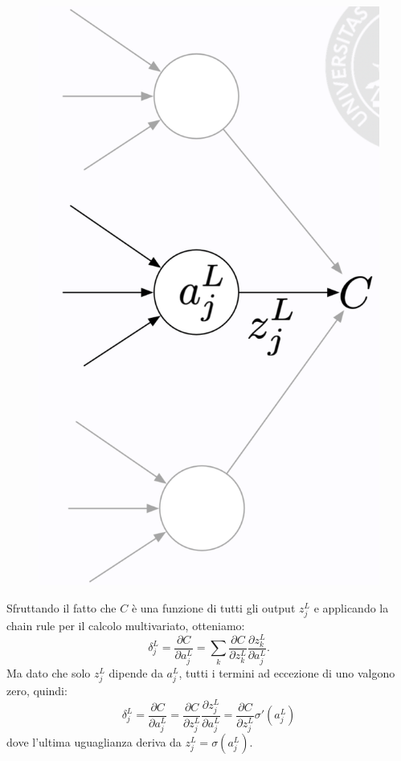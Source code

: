 \begin{figure}[!h]
    \includegraphics[scale=.3]{images/backpropagation/proofBp1.png}
    \centering
\end{figure}


Sfruttando il fatto che $C$ è una funzione di tutti gli output $z^L_j$ e applicando la chain rule per il calcolo multivariato, otteniamo:
\begin{equation}
    \delta^L_j=\frac{\partial C}{\partial a^L_j}=\sum_k\frac{\partial C}{\partial z^L_k}\frac{\partial z^L_k}{\partial a^L_j}.
\end{equation}
Ma dato che solo $z^L_j$ dipende da $a^L_j$, tutti i termini ad eccezione di uno valgono zero, quindi:
\begin{equation}
    \delta^L_j = \frac{\partial C}{\partial a^L_j} = \frac{\partial C}{\partial z^L_j} \frac{\partial z^L_j}{\partial a^L_j} = \frac{\partial C}{\partial z^L_j}\sigma'(a^L_j)
\end{equation}
dove l'ultima uguaglianza deriva da $z^L_j = \sigma(a^L_j)$.
\newpage

